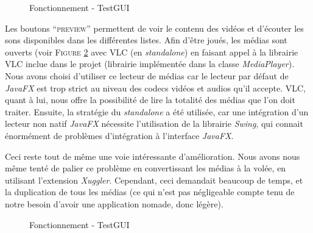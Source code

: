 \begin{figure}[!ht]
\begin{center}
  \caption{Fonctionnement - TestGUI}
  \label{TestGUI}
\end{center}
\end{figure}

Les boutons ``\textsc{preview}'' permettent de voir le contenu des vidéos et d'écouter les sons disponibles dans les différentes listes. Afin d'être joués, les médias sont ouverts (voir \textsc{Figure} \ref{VLC} avec VLC (en \textit{standalone}) en faisant appel à la librairie VLC inclue dans le projet (librairie implémentée dans la classe \textit{MediaPlayer}). Nous avons choisi d'utiliser ce lecteur de médias car le lecteur par défaut de \textit{JavaFX} est trop strict au niveau des codecs vidéos et audios qu'il accepte. VLC, quant à lui, nous offre la possibilité de lire la totalité des médias que l'on doit traiter. Ensuite, la stratégie du \textit{standalone} a été utilisée, car une intégration d'un lecteur non natif \textit{JavaFX} nécessite l'utilisation de la librairie \textit{Swing}, qui connait énormément de problèmes d'intégration à l'interface \textit{JavaFX}.

Ceci reste tout de même une voie intéressante d'amélioration. Nous avons nous même tenté de palier ce problème en convertissant les médias à la volée, en utilisant l'extension \textit{Xuggler}. Cependant, ceci demandait beaucoup de temps, et la duplication de tous les médias (ce qui n'est pas négligeable compte tenu de notre besoin d'avoir une application nomade, donc légère).

\begin{figure}[!ht]
\begin{center}
  \caption{Fonctionnement - TestGUI}
  \label{VLC} 
\end{center}
\end{figure}

